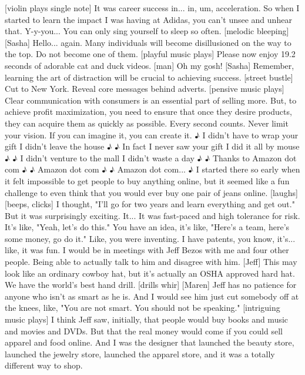 \documentclass[a4paper]{article}
\begin{document}
	[violin plays single note]
	It was career success in... in, um, acceleration.
	So when I started to learn the impact I was having at Adidas,
	you can't unsee and unhear that.
	Y-y-you...
	You can only sing yourself to sleep so often.
	[melodic bleeping]
	[Sasha] Hello... again.
	Many individuals will become disillusioned on the way to the top.
	Do not become one of them.
	[playful music plays]
	Please now enjoy
	19.2 seconds of adorable cat and duck videos.
	[man] Oh my gosh!
	[Sasha] Remember, learning the art of distraction
	will be crucial to achieving success.
	[street bustle]
	Cut to New York.
	Reveal core messages behind adverts.
	[pensive music plays]
	Clear communication with consumers
	is an essential part of selling more.
	But, to achieve profit maximization,
	you need to ensure that once they desire products,
	they can acquire them as quickly as possible.
	Every second counts.
	Never limit your vision.
	If you can imagine it, you can create it.
	♪ I didn't have to wrap your gift I didn't leave the house ♪
	♪ In fact I never saw your gift I did it all by mouse ♪
	♪ I didn't venture to the mall I didn't waste a day ♪
	♪ Thanks to Amazon dot com ♪
	♪ Amazon dot com ♪
	♪ Amazon dot com... ♪
	I started there so early
	when it felt impossible to get people to buy anything online,
	but it seemed like a fun challenge
	to even think that you would ever buy one pair of jeans online. [laughs]
	[beeps, clicks]
	I thought, "I'll go for two years and learn everything and get out."
	But it was surprisingly exciting.
	It... It was fast-paced and high tolerance for risk.
	It's like, "Yeah, let's do this."
	You have an idea, it's like, "Here's a team, here's some money, go do it."
	Like, you were inventing. I have patents, you know, it's... like, it was fun.
	I would be in meetings with Jeff Bezos with me and four other people.
	Being able to actually talk to him and disagree with him.
	[Jeff] This may look like an ordinary cowboy hat,
	but it's actually an OSHA approved hard hat.
	We have the world's best hand drill.
	[drills whir]
	[Maren] Jeff has no patience for anyone who isn't as smart as he is.
	And I would see him just cut somebody off at the knees, like,
	"You are not smart. You should not be speaking."
	[intriguing music plays]
	I think Jeff saw, initially, that people would buy books and music
	and movies and DVDs.
	But that the real money would come if you could sell apparel
	and food online.
	And I was the designer that launched the beauty store,
	launched the jewelry store, launched the apparel store,
	and it was a totally different way to shop.
\end{document}
